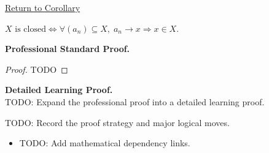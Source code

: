 \newpage
{}
\label{prf:closed-iff-seq-limits}

\begin{remark*}[Return]
\hyperref[cor:closed-iff-seq-limits]{Return to Corollary}
\end{remark*}

\begin{corollary*}
$X\text{ is closed} \iff \forall (a_n)\subseteq X,\; a_n \to x \Rightarrow x \in X$.
\end{corollary*}

\textbf{Professional Standard Proof.}~\\
\begin{proof}
TODO
\end{proof}

\textbf{Detailed Learning Proof.}~\\
TODO: Expand the professional proof into a detailed learning proof.

\begin{remark*}
TODO: Record the proof strategy and major logical moves.
\end{remark*}

\begin{dependencies}
\begin{itemize}
  \item TODO: Add mathematical dependency links.
\end{itemize}
\end{dependencies}
